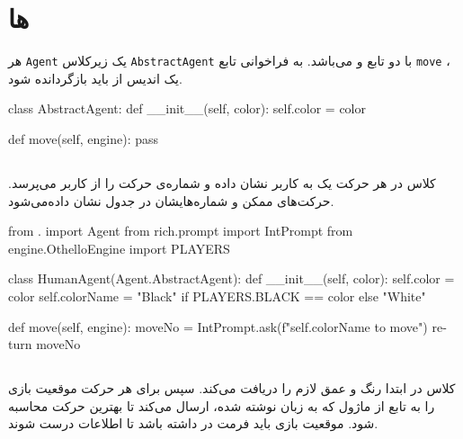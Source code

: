 \section{ ها}
هر
\verb;Agent;
یک زیرکلاس
\verb;AbstractAgent;
با دو تابع
و 
می‌باشد.
به فراخوانی تابع 
\verb;move;
،
یک اندیس از
باید بازگردانده شود.

\begin{latin}
\begin{python}
class AbstractAgent:
    def __init__(self, color):
        self.color = color
    
    def move(self, engine):
        pass

\end{python}
\end{latin}

\subsection{}
کلاس
در هر حرکت یک
به کاربر نشان داده  و شماره‌ی حرکت را از کاربر می‌پرسد.
حرکت‌های ممکن و شماره‌هایشان در جدول نشان داده‌می‌شود.

\begin{latin}
\begin{python}
from . import Agent
from rich.prompt import IntPrompt
from engine.OthelloEngine import PLAYERS

class HumanAgent(Agent.AbstractAgent):
    def __init__(self, color):
        self.color = color
        self.colorName = "Black" if PLAYERS.BLACK == color else "White"

    def move(self, engine):
        moveNo = IntPrompt.ask(f"{self.colorName} to move")
        return moveNo

\end{python}
\end{latin}

\subsection{}
کلاس
در ابتدا رنگ و عمق لازم را دریافت می‌کند.
سپس برای هر حرکت موقعیت بازی را به  تابع
از ماژول
که به زبان
نوشته شده،
ارسال می‌کند تا بهترین حرکت محاسبه شود.
موقعیت بازی باید فرمت
در
داشته باشد تا اطلاعات درست
شوند.

